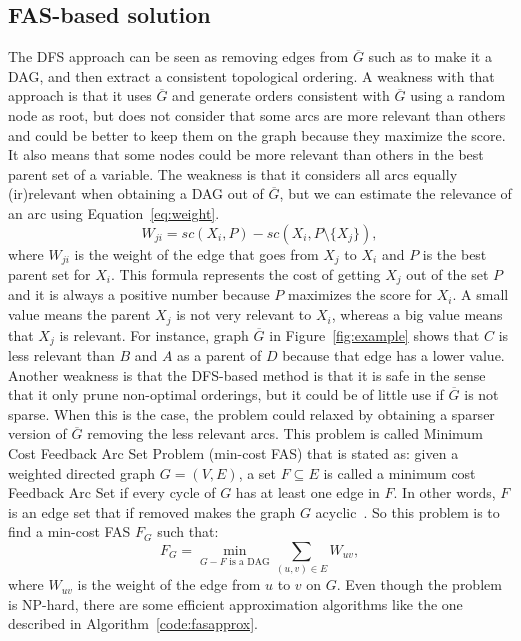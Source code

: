\subsection{FAS-based solution}
\label{subsec:fasapproach}
The DFS approach can be seen as removing edges from $\overline G$ such as to make it a DAG, and then extract a consistent topological ordering. A weakness with that approach is that it uses $\overline G$ and generate orders consistent with $\overline G$ using a random node as root, but does not consider that some arcs are more relevant than others and could be better to keep them on the graph because they maximize the score. It also means that some nodes could be more relevant than others in the best parent set of a variable. The weakness is that it considers all arcs equally (ir)relevant when obtaining a DAG out of $\overline G$, but we can estimate the relevance of an arc using Equation~\ref{eq:weight}.
	\begin{equation}
		\label{eq:weight}
		W_{ji} = {sc}( X_i , P ) - {sc}( X_i , P \setminus \{ X_j \} ) ,
	\end{equation}
where $W_{ji}$ is the weight of the edge that goes from $X_j$ to $X_i$ and $P$ is the best parent set for $X_i$. This formula represents the cost of getting $X_j$ out of the set $P$ and it is always a positive number because $P$ maximizes the score for $X_i$. A small value means the parent $X_j$ is not very relevant to $X_i$, whereas a big value means that $X_j$ is relevant. For instance, graph $\overline G$ in Figure~\ref{fig:example} shows that $C$ is less relevant than $B$ and $A$ as a parent of $D$ because that edge has a lower value.\\
Another weakness is that the DFS-based method is that it is safe in the sense that it only prune non-optimal orderings, but it could be of little use if $\overline G$ is not sparse. When this is the case, the problem could relaxed by obtaining a sparser version of $\overline G$ removing the less relevant arcs.
This problem is called Minimum Cost Feedback Arc Set Problem (min-cost FAS) that is stated as: given a weighted directed graph $G = ( V , E )$, a set $F \subseteq E$ is called a minimum cost Feedback Arc Set if every cycle of $G$ has at least one edge in $F$. In other words, $F$ is an edge set that if removed makes the graph $G$ acyclic~\cite{DF01}. So this problem is to find a min-cost FAS $F_G$ such that:
	\begin{equation}
		\label{eq:mincostfas}
		F_{G} = \min_{G - F \text{ is a DAG}} \sum_{(u,v) \in E} W_{uv} ,
	\end{equation}
where $W_{uv}$ is the weight of the edge from $u$ to $v$ on $G$. Even though the problem is NP-hard, there are some efficient approximation algorithms like the one described in Algorithm~\ref{code:fasapprox}.

